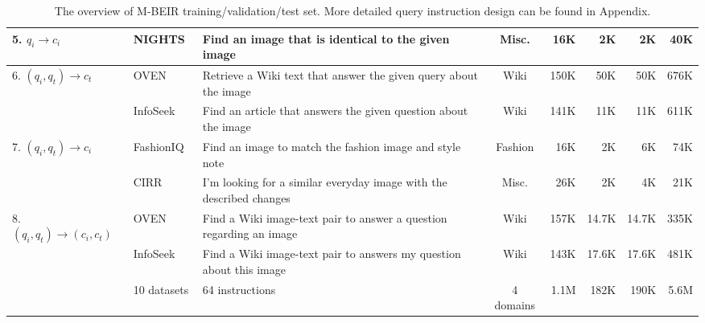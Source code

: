 \begin{table}
{\begin{tabular}{@{}lllcr@{\;\;}r@{\;\;}r@{\;\;}r@{}}
         \midrule
         5. $q_i  \to c_i$ & NIGHTS~\citep{fu2023learning}  & Find an image that is identical to the given image              & Misc.     & 16K    & 2K         & 2K     & 40K    \\
         \midrule
         \multirow{2}{*}{6. $(q_i, q_t) \to c_t$} 
         & OVEN~\citep{hu2023open}                          & Retrieve a Wiki text that answer the given query about the image  & Wiki      & 150K   & 50K        & 50K    & 676K   \\
         & InfoSeek~\citep{chen2023infoseek}                & Find an article that answers the given question about the image & Wiki      & 141K  & 11K        & 11K    & 611K \\
         \midrule
         \multirow{2}{*}{7. $(q_i, q_t) \to c_i$} 
         & FashionIQ~\citep{wu2021fashion}                  & Find an image to match the fashion image and style note          & Fashion   & 16K    & 2K      & 6K         & 74K    \\
         & CIRR~\citep{liu2021image}                        &  I'm looking for a similar everyday image with the described changes        & Misc.     & 26K    & 2K      & 4K         & 21K    \\
         \midrule
         \multirow{2}{*}{8. $(q_i, q_t) \to (c_i, c_t)$} 
         & OVEN~\citep{hu2023open}                          & Find a Wiki image-text pair to answer a question regarding an image    & Wiki      & 157K   & 14.7K      & 14.7K         & 335K   \\
         & InfoSeek~\citep{chen2023infoseek}                & Find a Wiki image-text pair to answers my question about this image    & Wiki      & 143K   & 17.6K      & 17.6K         & 481K \\
         \midrule
                       & 10 datasets & 64 instructions & 4 domains & 1.1M & 182K & 190K & 5.6M \\
         \bottomrule
    \end{tabular}
    }
    
    \caption{The overview of M-BEIR training/validation/test set. More detailed query instruction design can be found in Appendix.} 
    \label{tab:dataset}
    \vspace{-2pt}
\end{table}